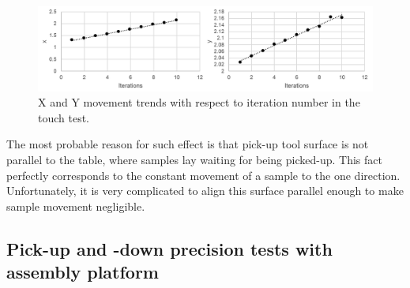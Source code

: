 \begin{figure}[ht]\centering
\includegraphics[width=1\linewidth]{Data/Precision_tests/XY_touch_movement.png}
\caption{X and Y movement trends with respect to iteration number in the touch test.}
\label{fig:touch_move}
\end{figure}

The most probable reason for such effect is that pick-up tool surface is not parallel to the table, where samples lay waiting for being picked-up. This fact perfectly corresponds to the constant movement of a sample to the one direction. Unfortunately, it is very complicated to align this surface parallel enough to make sample movement negligible.

\subsection{Pick-up and -down precision tests with assembly platform}

